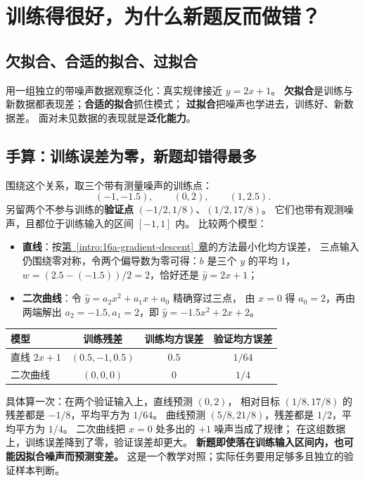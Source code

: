 \chapterrule
\section{训练得很好，为什么新题反而做错？}
\label{intro:18-generalization}

\subsection{欠拟合、合适的拟合、过拟合}
\label{concept:underfitting}
\label{concept:overfitting}
\label{concept:generalization}

用一组独立的带噪声数据观察泛化：真实规律接近 $y=2x+1$。
\textbf{欠拟合}是训练与新数据都表现差；\textbf{合适的拟合}抓住模式；
\textbf{过拟合}把噪声也学进去，训练好、新数据差。
面对未见数据的表现就是\textbf{泛化能力}。



\subsection{手算：训练误差为零，新题却错得最多}

围绕这个关系，取三个带有测量噪声的训练点：
\[
(-1,-1.5),\qquad(0,2),\qquad(1,2.5).
\]
另留两个不参与训练的\textbf{验证点} $(-1/2,1/8)$、$(1/2,17/8)$。
它们也带有观测噪声，且都位于训练输入的区间 $[-1,1]$ 内。
比较两个模型：
\begin{itemize}
\item \textbf{直线}：按\hyperref[intro:16a-gradient-descent]{第~\ref*{intro:16a-gradient-descent}~章}的方法最小化均方误差，
三点输入仍围绕零对称，令两个偏导数为零可得：$b$ 是三个 $y$ 的平均 $1$，
$w=(2.5-(-1.5))/2=2$，恰好还是 $\widehat{y}=2x+1$；
\item \textbf{二次曲线}：令 $\widehat{y}=a_2x^2+a_1x+a_0$ 精确穿过三点，
由 $x=0$ 得 $a_0=2$，再由两端解出 $a_2=-1.5,a_1=2$，即 $\widehat{y}=-1.5x^2+2x+2$。
\end{itemize}
\begin{center}\small
{}
\begin{tabular}{lccc}
\toprule
模型 & 训练残差 & 训练均方误差 & 验证均方误差\\\midrule
直线 $2x+1$ & $(0.5,-1,0.5)$ & $0.5$ & $1/64$\\
二次曲线 & $(0,0,0)$ & $0$ & $1/4$\\
\bottomrule
\end{tabular}
\end{center}
具体算一次：在两个验证输入上，直线预测 $(0,2)$，
相对目标 $(1/8,17/8)$ 的残差都是 $-1/8$，平均平方为 $1/64$。
曲线预测 $(5/8,21/8)$，残差都是 $1/2$，平均平方为 $1/4$。
二次曲线把 $x=0$ 处多出的 $+1$ 噪声当成了规律；
在这组数据上，训练误差降到了零，验证误差却更大。
\textbf{新题即使落在训练输入区间内，也可能因拟合噪声而预测变差。}
这是一个教学对照；实际任务要用足够多且独立的验证样本判断。

